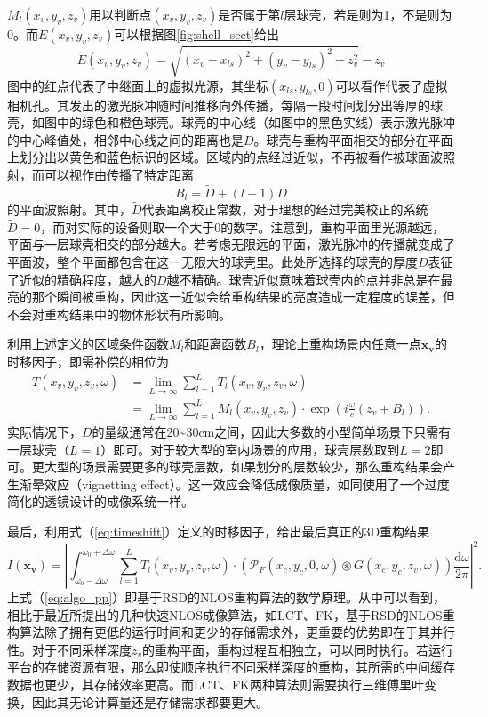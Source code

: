 \documentclass[master]{shtthesis}             %
\begin{document}
$M_l(x_v,y_v,z_v)$用以判断点$(x_v,y_v,z_v)$是否属于第$l$层球壳，若是则为1，不是则为0。而$E(x_v,y_v,z_v)$可以根据图\ref{fig:shell_sect}给出
\begin{equation}
  E(x_v,y_v,z_v) = \sqrt{(x_v-x_{ls})^2+(y_v-y_{ls})^2+z_v^2} - z_v
\end{equation}
图中的红点代表了中继面上的虚拟光源，其坐标$(x_{ls},y_{ls},0)$可以看作代表了虚拟相机孔。其发出的激光脉冲随时间推移向外传播，每隔一段时间划分出等厚的球壳，如图中的绿色和橙色球壳。球壳的中心线（如图中的黑色实线）表示激光脉冲的中心峰值处，相邻中心线之间的距离也是$D$。球壳与重构平面相交的部分在平面上划分出以黄色和蓝色标识的区域。区域内的点经过近似，不再被看作被球面波照射，而可以视作由传播了特定距离
\begin{equation}
  B_l = \tilde{D} + (l-1) D
\end{equation}
的平面波照射。其中，$\tilde{D}$代表距离校正常数，对于理想的经过完美校正的系统$\tilde{D}=0$，而对实际的设备则取一个大于0的数字。注意到，重构平面里光源越远，平面与一层球壳相交的部分越大。若考虑无限远的平面，激光脉冲的传播就变成了平面波，整个平面都包含在这一无限大的球壳里。此处所选择的球壳的厚度$D$表征了近似的精确程度，越大的$D$越不精确。球壳近似意味着球壳内的点并非总是在最亮的那个瞬间被重构，因此这一近似会给重构结果的亮度造成一定程度的误差，但不会对重构结果中的物体形状有所影响。

利用上述定义的区域条件函数$M_l$和距离函数$B_l$，理论上重构场景内任意一点$\mathbf{x_v}$的时移因子，即需补偿的相位为
\begin{equation}
  \begin{split}\label{eq:timeshift}
    T(x_v,y_v,z_v,\omega) &= \lim_{L\rightarrow \infty} \sum_{l=1}^L T_l(x_v,y_v,z_v,\omega) \\
    &= \lim_{L\rightarrow \infty} \sum_{l=1}^LM_l(x_v,y_v,z_v)\cdot \exp \left( i\frac{\omega}{c} (z_v+B_l) \right).
  \end{split}
\end{equation}
实际情况下，$D$的量级通常在20\textasciitilde30cm之间，因此大多数的小型简单场景下只需有一层球壳（$L=1$）即可。对于较大型的室内场景的应用，球壳层数取到$L=2$即可。更大型的场景需要更多的球壳层数，如果划分的层数较少，那么重构结果会产生渐晕效应（vignetting effect）。这一效应会降低成像质量，如同使用了一个过度简化的透镜设计的成像系统一样。

最后，利用式（\ref{eq:timeshift}）定义的时移因子，给出最后真正的3D重构结果
\begin{equation}\label{eq:algo_pp}
  I(\mathbf{x_v}) =\left\lvert \int_{\omega_0-\Delta\omega}^{\omega_0+\Delta\omega} \sum_{l=1}^L T_l(x_v,y_v,z_v,\omega) \cdot \left(\mathcal{P}_F(x_c,y_c,0,\omega)\circledast G(x_c,y_c,z_v,\omega)\right) \frac{\text{d}\omega}{2\pi} \right\rvert^2.
\end{equation} 
上式（\ref{eq:algo_pp}）即基于RSD的NLOS重构算法的数学原理。从中可以看到，相比于最近所提出的几种快速NLOS成像算法，如LCT、FK，基于RSD的NLOS重构算法除了拥有更低的运行时间和更少的存储需求外，更重要的优势即在于其并行性。对于不同采样深度$z_v$的重构平面，重构过程互相独立，可以同时执行。若运行平台的存储资源有限，那么即使顺序执行不同采样深度的重构，其所需的中间缓存数据也更少，其存储效率更高。而LCT、FK两种算法则需要执行三维傅里叶变换，因此其无论计算量还是存储需求都要更大。
\end{document}
